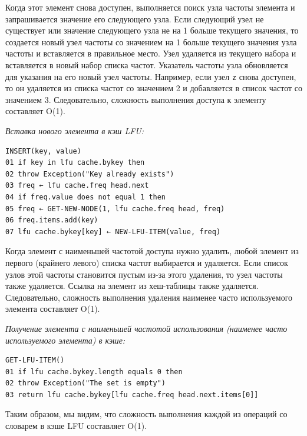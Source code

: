 \documentclass[a4paper, 12pt]{article}
\begin{document}
Когда этот элемент снова доступен, выполняется поиск узла частоты элемента и запрашивается значение его следующего узла. Если следующий узел не существует или значение следующего узла не на 1 больше текущего значения, то создается новый узел частоты со значением на 1 больше текущего значения узла частоты и вставляется в правильное место. Узел удаляется из текущего набора и вставляется в новый набор списка частот. Указатель частоты узла обновляется для указания на его новый узел частоты. Например, если узел \texttt{z} снова доступен, то он удаляется из списка частот со значением 2 и добавляется в список частот со значением 3. Следовательно, сложность выполнения доступа к элементу составляет O(1).

\textit{Вставка нового элемента в кэш LFU:}
\begin{verbatim}
INSERT(key, value)
01 if key in lfu cache.bykey then
02 throw Exception("Key already exists")
03 freq ← lfu cache.freq head.next
04 if freq.value does not equal 1 then
05 freq ← GET-NEW-NODE(1, lfu cache.freq head, freq)
06 freq.items.add(key)
07 lfu cache.bykey[key] ← NEW-LFU-ITEM(value, freq)
\end{verbatim}

Когда элемент с наименьшей частотой доступа нужно удалить, любой элемент из первого (крайнего левого) списка частот выбирается и удаляется. Если список узлов этой частоты становится пустым из-за этого удаления, то узел частоты также удаляется. Ссылка на элемент из хеш-таблицы также удаляется. Следовательно, сложность выполнения удаления наименее часто используемого элемента составляет O(1).

\textit{Получение элемента с наименьшей частотой использования (наименее часто используемого элемента) в кэше:}
\begin{verbatim}
GET-LFU-ITEM()
01 if lfu cache.bykey.length equals 0 then
02 throw Exception("The set is empty")
03 return lfu cache.bykey[lfu cache.freq head.next.items[0]]
\end{verbatim}

Таким образом, мы видим, что сложность выполнения каждой из операций со словарем в кэше LFU составляет O(1).
\end{document}
